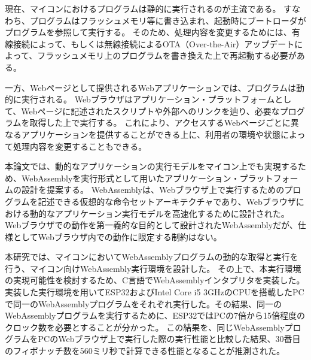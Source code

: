 \begin{jabstract}

現在、マイコンにおけるプログラムは静的に実行されるのが主流である。
すなわち、プログラムはフラッシュメモリ等に書き込まれ、起動時にブートローダがプログラムを参照して実行する。
そのため、処理内容を変更するためには、有線接続によって、もしくは無線接続によるOTA（Over-the-Air）アップデートによって、フラッシュメモリ上のプログラムを書き換えた上で再起動する必要がある。

一方、Webページとして提供されるWebアプリケーションでは、プログラムは動的に実行される。
Webブラウザはアプリケーション・プラットフォームとして、Webページに記述されたスクリプトや外部へのリンクを辿り、必要なプログラムを取得した上で実行する。
これにより、アクセスするWebページごとに異なるアプリケーションを提供することができる上に、利用者の環境や状態によって処理内容を変更することもできる。

本論文では、動的なアプリケーションの実行モデルをマイコン上でも実現するため、WebAssemblyを実行形式として用いたアプリケーション・プラットフォームの設計を提案する。
WebAssemblyは、Webブラウザ上で実行するためのプログラムを記述できる仮想的な命令セットアーキテクチャであり、Webブラウザにおける動的なアプリケーション実行モデルを高速化するために設計された。
Webブラウザでの動作を第一義的な目的として設計されたWebAssemblyだが、仕様としてWebブラウザ内での動作に限定する制約はない。

本研究では、マイコンにおいてWebAssemblyプログラムの動的な取得と実行を行う、マイコン向けWebAssembly実行環境を設計した。
その上で、本実行環境の実現可能性を検討するため、C言語でWebAssemblyインタプリタを実装した。
実装した実行環境を用いてESP32およびIntel Core i5 3GHzのCPUを搭載したPCで同一のWebAssemblyプログラムをそれぞれ実行した。その結果、同一のWebAssemblyプログラムを実行するために、ESP32ではPCの7倍から15倍程度のクロック数を必要とすることが分かった。
この結果を、同じWebAssemblyプログラムをPCのWebブラウザ上で実行した際の実行性能と比較した結果、30番目のフィボナッチ数を560ミリ秒で計算できる性能となることが推測された。

\end{jabstract}
